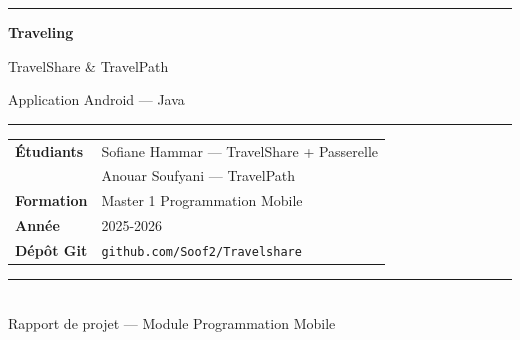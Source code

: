 \documentclass[a4paper,12pt,openany]{report}
\begin{document}
\pagestyle{empty}

\begin{titlepage}
\centering
\vspace*{2cm}

{\color{navy}\rule{\textwidth}{1.5pt}}
\vspace{1cm}

{\fontsize{42}{50}\selectfont\bfseries\color{navy} Traveling\par}
\vspace{0.3cm}
{\large\color{teal} TravelShare \& TravelPath\par}
\vspace{0.2cm}
{\normalsize\color{gray} Application Android — Java\par}

\vspace{1cm}
{\color{navy}\rule{\textwidth}{0.5pt}}

\vspace{2.5cm}

\begin{tabular}{ll}
  \textbf{Étudiants} & Sofiane Hammar \quad — \quad TravelShare + Passerelle \\[4pt]
                     & Anouar Soufyani \quad — \quad TravelPath \\[14pt]
  \textbf{Formation} & Master 1 Programmation Mobile \\[4pt]
  \textbf{Année}     & 2025-2026 \\[14pt]
  \textbf{Dépôt Git} & \texttt{github.com/Soof2/Travelshare}
\end{tabular}

\vfill
{\color{bord}\rule{\textwidth}{0.5pt}}\\[4pt]
{\small\color{gray} Rapport de projet — Module Programmation Mobile}
\end{titlepage}

\nopagecolor
\pagestyle{fancy}
\tableofcontents
\clearpage
\end{document}
